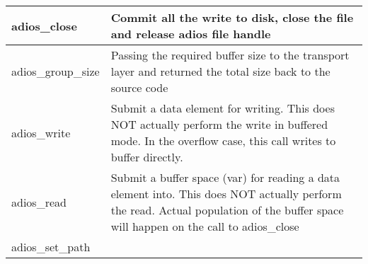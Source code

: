 {\begin{longtable}{llll}
\hline
\multicolumn{1}{|p{1.540in}|}{\begin{minipage}[t]{1.540in}\raggedright
\label{HToc82064263}adios\_close\end{minipage}} & \multicolumn{3}{p{2.960in}|}{\begin{minipage}[t]{2.960in}\raggedright
\linebreak
{\color{color01} Commit all the write to disk, close the file and release adios 
file handle}\end{minipage}}\\
\hline
\multicolumn{1}{|p{1.540in}|}{\begin{minipage}[t]{1.540in}\raggedright
adios\_group\_size\end{minipage}} & \multicolumn{3}{p{2.960in}|}{\begin{minipage}[t]{2.960in}\raggedright
Passing the required buffer size to the transport layer and returned the total 
size back to the source code\end{minipage}}\\
\hline
\multicolumn{1}{|p{1.540in}|}{\begin{minipage}[t]{1.540in}\raggedright
\label{HToc82064265}adios\_write\end{minipage}} & \multicolumn{3}{p{2.960in}|}{\begin{minipage}[t]{2.960in}\raggedright
\linebreak
{\color{color01} Submit a data element for writing. This does NOT actually perform 
the write in buffered mode. In the overflow case, this call writes to buffer directly. 
}\end{minipage}}\\
\hline
\multicolumn{1}{|p{1.540in}|}{\begin{minipage}[t]{1.540in}\raggedright
\label{HToc82064266}adios\_read\end{minipage}} & \multicolumn{3}{p{2.960in}|}{\begin{minipage}[t]{2.960in}\raggedright
\linebreak
{\color{color01} Submit a buffer space (var) for reading a data element into. This 
does NOT actually perform the read. Actual population of the buffer space will 
happen on the call to adios\_close}\end{minipage}}\\
\hline
\multicolumn{1}{|p{1.540in}|}{\begin{minipage}[t]{1.540in}\raggedright
\label{HToc82064267}adios\_set\_path\end{minipage}} & \multicolumn{3}{p{2.960in}|}{\begin{minipage}[t]{2.960in}\raggedright

\end{minipage}}
\end{longtable}}
